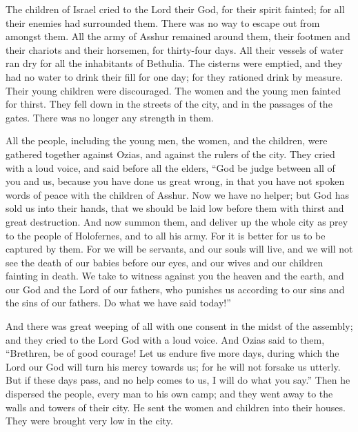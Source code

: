  The children of Israel cried to the Lord their God, for
their spirit fainted; for all their enemies had surrounded them. There
was no way to escape out from amongst them.  All the army
of Asshur remained around them, their footmen and their chariots and
their horsemen, for thirty-four days. All their vessels of water ran dry
for all the inhabitants of Bethulia.  The cisterns were
emptied, and they had no water to drink their fill for one day; for they
rationed drink by measure.  Their young children were
discouraged. The women and the young men fainted for thirst. They fell
down in the streets of the city, and in the passages of the gates. There
was no longer any strength in them.

 All the people, including the young men, the women, and
the children, were gathered together against Ozias, and against the
rulers of the city. They cried with a loud voice, and said before all
the elders,  ``God be judge between all of you and us,
because you have done us great wrong, in that you have not spoken words
of peace with the children of Asshur.  Now we have no
helper; but God has sold us into their hands, that we should be laid low
before them with thirst and great destruction.  And now
summon them, and deliver up the whole city as prey to the people of
Holofernes, and to all his army.  For it is better for us
to be captured by them. For we will be servants, and our souls will
live, and we will not see the death of our babies before our eyes, and
our wives and our children fainting in death.  We take to
witness against you the heaven and the earth, and our God and the Lord
of our fathers, who punishes us according to our sins and the sins of
our fathers. Do what we have said today!''

 And there was great weeping of all with one consent in the
midst of the assembly; and they cried to the Lord God with a loud voice.
 And Ozias said to them, ``Brethren, be of good courage!
Let us endure five more days, during which the Lord our God will turn
his mercy towards us; for he will not forsake us utterly. 
But if these days pass, and no help comes to us, I will do what you
say.''  Then he dispersed the people, every man to his own
camp; and they went away to the walls and towers of their city. He sent
the women and children into their houses. They were brought very low in
the city.

